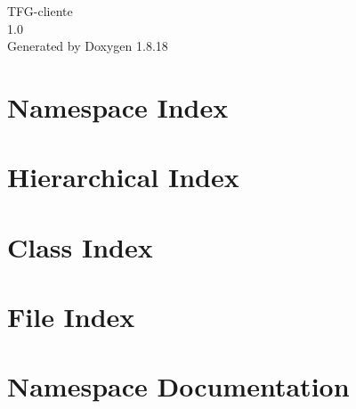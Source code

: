 \let\mypdfximage\pdfximage\def\pdfximage{\immediate\mypdfximage}\documentclass[twoside]{book}
\newcommand{\+}{\discretionary{\mbox{\scriptsize$\hookleftarrow$}}{}{}}
\newcommand{\clearemptydoublepage}{%
  \newpage{\pagestyle{empty}\cleardoublepage}%
}
\begin{document}
\hypersetup{pageanchor=false,
             bookmarksnumbered=true,
             pdfencoding=unicode
            }
\begin{titlepage}
\vspace*{7cm}
\begin{center}%
{\Large T\+F\+G-\/cliente \\[1ex]\large 1.\+0 }\\
\vspace*{1cm}
{\large Generated by Doxygen 1.8.18}\\
\end{center}
\end{titlepage}
\clearemptydoublepage
{}
\tableofcontents
\clearemptydoublepage
{}
\hypersetup{pageanchor=true}

\chapter{Namespace Index}

\chapter{Hierarchical Index}

\chapter{Class Index}

\chapter{File Index}

\chapter{Namespace Documentation}


\end{document}
